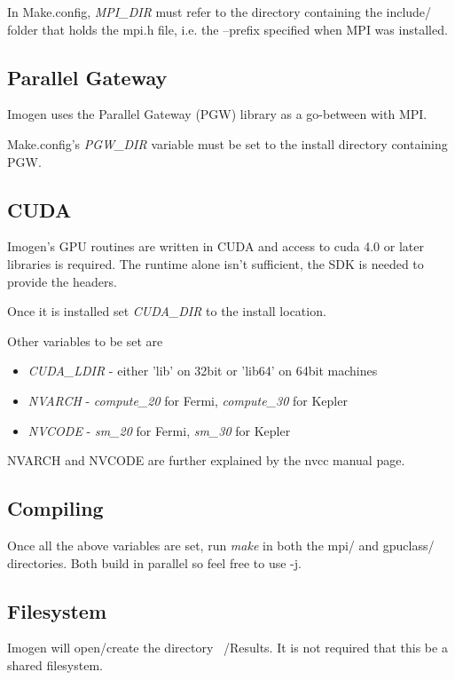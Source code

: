 \documentclass[letterpaper,12pt]{article}
\begin{document}
In Make.config, \textit{MPI\_DIR} must refer to the directory containing the include/ folder
that holds the mpi.h file, i.e. the --prefix specified when MPI was installed.

\subsection{Parallel Gateway}

Imogen uses the Parallel Gateway (PGW) library as a go-between with MPI.

Make.config's \textit{PGW\_DIR} variable must be set to the install directory
containing PGW.

\subsection{CUDA}

Imogen's GPU routines are written in CUDA and access to cuda 4.0 or later
libraries is required. The runtime alone isn't sufficient, the SDK is
needed to provide the headers.

Once it is installed set \textit{CUDA\_DIR} to the install location.

Other variables to be set are
\begin{itemize}
\item \textit{CUDA\_LDIR} - either 'lib' on 32bit or 'lib64' on 64bit machines
\item \textit{NVARCH} - \textit{compute\_20} for Fermi, \textit{compute\_30} for Kepler
\item \textit{NVCODE} - \textit{sm\_20} for Fermi, \textit{sm\_30} for Kepler
\end{itemize}

NVARCH and NVCODE are further explained by the nvcc manual page.

\subsection{Compiling}

Once all the above variables are set, run \textit{make} in both the mpi/ and gpuclass/
directories. Both build in parallel so feel free to use -j. 

\subsection{Filesystem}

Imogen will open/create the directory ~/Results. It is not required that this
be a shared filesystem.
\end{document}
